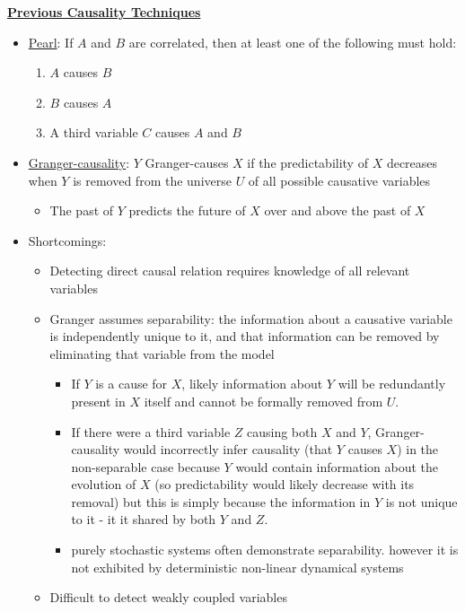 \documentclass[10pt,a4paper]{article}
\begin{document}
\noindent\underline{\textbf{Previous Causality Techniques}}
\begin{itemize}
\item \underline{Pearl}: If $A$ and $B$ are correlated, then at least one of the following must hold:
\begin{enumerate}
\item $A$ causes $B$
\item $B$ causes $A$
\item A third variable $C$ causes $A$ and $B$
\end{enumerate}
\item \underline{Granger-causality}: $Y$ Granger-causes $X$ if the predictability of $X$ decreases when $Y$ is removed from the universe $U$ of all possible causative variables
\begin{itemize}
\item The past of $Y$ predicts the future of $X$ over and above the past of $X$
\end{itemize}
\item Shortcomings: 
\begin{itemize}
\item Detecting direct causal relation requires knowledge of all relevant variables
\item Granger assumes separability: the information about a causative variable is independently unique to it, and that information can be removed by eliminating that variable from the model
\begin{itemize}
\item If $Y$ is a cause for $X$, likely information about $Y$ will be redundantly present in $X$ itself and cannot be formally removed from $U$.
\item If there were a third variable $Z$ causing both $X$ and $Y$, Granger-causality would incorrectly infer causality (that $Y$ causes $X$) in the non-separable case because $Y$ would contain information about the evolution of $X$ (so predictability would likely decrease with its removal) but this is simply because the information in $Y$ is not unique to it - it it shared by both $Y$ and $Z$.
\item purely stochastic systems often demonstrate separability. however it is not exhibited by deterministic non-linear dynamical systems
\end{itemize}
\item Difficult to detect weakly coupled variables
\end{itemize}
\end{itemize}
\end{document}
